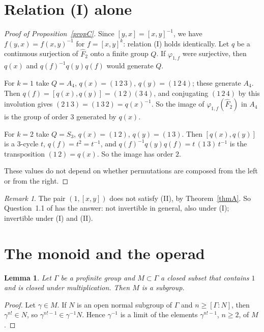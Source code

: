 \documentclass[11pt]{amsart}
\newtheorem{lemma}[thm]{Lemma}
\theoremstyle{definition}
\theoremstyle{remark}
\newtheorem{remark}[thm]{Remark}
\newcommand{\Fh}{\widehat F}
\newcommand{\ph}{\varphi}
\begin{document}
\section{Relation (I) alone}\label{sec:example}

\begin{proof}[Proof of Proposition~\ref{propC}]
Since $[y,x]=[x,y]^{-1}$, we have $f(y,x)=f(x,y)^{-1}$ for $f=[x,y]^k$: relation (I) holds identically. Let $q$ be a continuous surjection of $\Fh_2$ onto a finite group $Q$. If $\ph_{1,f}$ were surjective, then $q(x)$ and $q(f)^{-1}q(y)q(f)$ would generate $Q$.

For $k=1$ take $Q=A_4$, $q(x)=(1\,2\,3)$, $q(y)=(1\,2\,4)$; these generate $A_4$. Then $q(f)=[q(x),q(y)]=(1\,2)(3\,4)$, and conjugating $(1\,2\,4)$ by this involution gives $(2\,1\,3)=(1\,3\,2)=q(x)^{-1}$. So the image of $\ph_{1,f}(\Fh_2)$ in $A_4$ is the group of order $3$ generated by $q(x)$.

For $k=2$ take $Q=S_3$, $q(x)=(1\,2)$, $q(y)=(1\,3)$. Then $[q(x),q(y)]$ is a $3$-cycle $t$, $q(f)=t^2=t^{-1}$, and $q(f)^{-1}q(y)q(f)=t\,(1\,3)\,t^{-1}$ is the transposition $(1\,2)=q(x)$. So the image has order $2$.

These values do not depend on whether permutations are composed from the left or from the right.
\end{proof}

\begin{remark}
The pair $(1,[x,y])$ does not satisfy (II), by Theorem~\ref{thmA}. So Question~1.1 of \cite{LS} has the answer: not invertible in general, also under (I); invertible under (I) and (II).
\end{remark}

\section{The monoid and the operad}\label{sec:monoid}

\begin{lemma}\label{lem:monoid}
Let $\Gamma$ be a profinite group and $M\subset\Gamma$ a closed subset that contains $1$ and is closed under multiplication. Then $M$ is a subgroup.
\end{lemma}

\begin{proof}
Let $\gamma\in M$. If $N$ is an open normal subgroup of $\Gamma$ and $n\ge[\Gamma:N]$, then $\gamma^{n!}\in N$, so $\gamma^{n!-1}\in\gamma^{-1}N$. Hence $\gamma^{-1}$ is a limit of the elements $\gamma^{n!-1}$, $n\ge2$, of $M$.
\end{proof}
\end{document}
